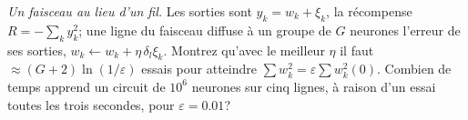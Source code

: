 \begin{exercise}[\lvlC]
\label{ex:10:7}
\emph{Un faisceau au lieu d'un fil.} Les sorties sont $y_k=w_k+\xi_k$, la récompense $R=-\sum_ky_k^2$; une ligne du faisceau diffuse à un groupe de $G$ neurones l'erreur de ses sorties, $w_k\leftarrow w_k+\eta\,\delta_l\xi_k$. Montrez qu'avec le meilleur $\eta$ il faut $\approx(G+2)\ln(1/\varepsilon)$ essais pour atteindre $\sum w_k^2=\varepsilon\sum w_k^2(0)$. Combien de temps apprend un circuit de $10^6$ neurones sur cinq lignes, à raison d'un essai toutes les trois secondes, pour $\varepsilon=0.01$?
\end{exercise}
